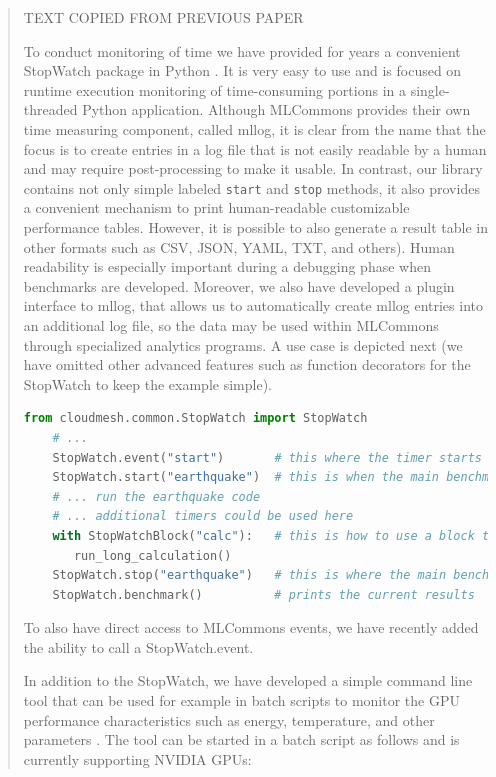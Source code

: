 \documentclass[utf8]{FrontiersinVancouver} %
\begin{document}
\begin{quote}

TEXT COPIED FROM PREVIOUS PAPER

To conduct monitoring of time we have provided for years a convenient StopWatch package in Python \citep{cloudmesh-stopwatch}.  It is very easy to use and is focused on runtime execution monitoring of time-consuming portions in a single-threaded Python application. Although MLCommons provides their own time measuring component, called mllog, it is clear from the name that the focus is to create entries in a log file that is not easily readable by a human and may require post-processing to make it usable. In contrast, our library contains not only simple labeled \texttt{start} and \texttt{stop} methods, it also provides a convenient mechanism to print human-readable customizable performance tables. However, it is possible to also generate a result table in other formats such as CSV, JSON, YAML, TXT, and others).  Human readability is especially important during a debugging phase when benchmarks are developed. Moreover, we also have developed a plugin interface to mllog, that allows us to automatically create mllog entries into an additional log file, so the data may be used within MLCommons through specialized analytics programs. A use case is depicted next (we have omitted other advanced features such as function decorators for the StopWatch to keep the example simple).



\begin{lstlisting}[language=Python]
    from cloudmesh.common.StopWatch import StopWatch 
    # ...
    StopWatch.event("start")       # this where the timer starts
    StopWatch.start("earthquake")  # this is when the main benchmark starts
    # ... run the earthquake code
    # ... additional timers could be used here
    with StopWatchBlock("calc"):   # this is how to use a block timer
       run_long_calculation()
    StopWatch.stop("earthquake")   # this is where the main benchmark ends
    StopWatch.benchmark()          # prints the current results
\end{lstlisting}

To also have direct access to MLCommons events, we have recently added the ability to call a StopWatch.event.


In addition to the StopWatch, we have developed a simple command line tool that can be used for example in batch scripts to monitor the GPU performance characteristics such as energy, temperature, and other parameters \citep{cloudmesh-gpu}. The tool can be started in a batch script as follows and is currently supporting NVIDIA GPUs:



\end{quote}
\end{document}
